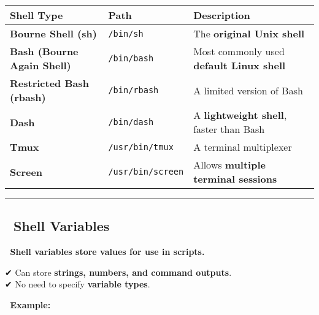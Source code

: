 \documentclass[
]{article}
\newenvironment{Shaded}{}{}
\newcommand{\BuiltInTok}[1]{\textcolor[rgb]{0.00,0.50,0.00}{#1}}
\newcommand{\CommentTok}[1]{\textcolor[rgb]{0.38,0.63,0.69}{\textit{#1}}}
\newcommand{\NormalTok}[1]{#1}
\newcommand{\OperatorTok}[1]{\textcolor[rgb]{0.40,0.40,0.40}{#1}}
\newcommand{\StringTok}[1]{\textcolor[rgb]{0.25,0.44,0.63}{#1}}
\newcommand{\VariableTok}[1]{\textcolor[rgb]{0.10,0.09,0.49}{#1}}
\begin{document}
\begin{longtable}[]{@{}
  >{\raggedright\arraybackslash}p{}
  >{\raggedright\arraybackslash}p{}
  >{\raggedright\arraybackslash}p{}@{}}
\toprule\noalign{}
\begin{minipage}[b]{\linewidth}\raggedright
\textbf{Shell Type}
\end{minipage} & \begin{minipage}[b]{\linewidth}\raggedright
\textbf{Path}
\end{minipage} & \begin{minipage}[b]{\linewidth}\raggedright
\textbf{Description}
\end{minipage} \\
\midrule\noalign{}
\endhead
\bottomrule\noalign{}
\endlastfoot
\textbf{Bourne Shell (sh)} & \texttt{/bin/sh} & The \textbf{original
Unix shell} \\
\textbf{Bash (Bourne Again Shell)} & \texttt{/bin/bash} & Most commonly
used \textbf{default Linux shell} \\
\textbf{Restricted Bash (rbash)} & \texttt{/bin/rbash} & A limited
version of Bash \\
\textbf{Dash} & \texttt{/bin/dash} & A \textbf{lightweight shell},
faster than Bash \\
\textbf{Tmux} & \texttt{/usr/bin/tmux} & A terminal multiplexer \\
\textbf{Screen} & \texttt{/usr/bin/screen} & Allows \textbf{multiple
terminal sessions} \\
\end{longtable}

\begin{center}\rule{0.5\linewidth}{0.5pt}\end{center}

\subsection{\texorpdfstring{\textbf{📌 Shell
Variables}}{📌 Shell Variables}}\label{shell-variables}

📌 \textbf{Shell variables store values for use in scripts.}

✔ Can store \textbf{strings, numbers, and command outputs}.\\
✔ No need to specify \textbf{variable types}.

📌 \textbf{Example:}

\begin{Shaded}
\end{Shaded}
\end{document}
